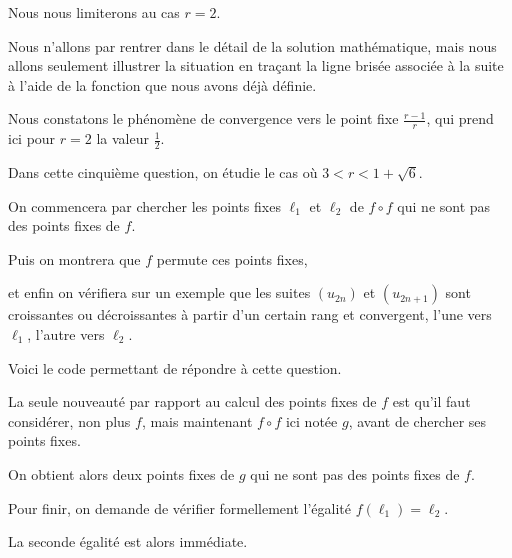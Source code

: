 Nous nous limiterons au cas $r=2$.


\diapo

Nous n'allons par rentrer dans le détail de la solution mathématique, 
mais nous allons seulement illustrer la situation en traçant la 
ligne brisée associée à la suite à l'aide de la fonction 
 que nous avons déjà définie. 

Nous constatons le phénomène de convergence vers le 
point fixe $\frac{r-1}{r}$, qui prend ici pour $r=2$ la valeur $\frac{1}{2}$.


\diapo

Dans cette cinquième question, on étudie le cas où $3<r<1+\sqrt{6}$.

\change

On commencera par chercher les points fixes $\ell_1$ et $\ell_2$ de $f\circ f$  
qui ne sont pas des points fixes de $f$.


\change

Puis on montrera que $f$ permute ces points fixes,

\change

et enfin on vérifiera sur un exemple que les suites $(u_{2n})$ et 
$(u_{2n+1})$ sont croissantes ou décroissantes à partir d'un certain rang
    et convergent, l'une vers $\ell_1$, l'autre vers $\ell_2$.



\diapo

Voici le code permettant de répondre à cette question.

La seule nouveauté par rapport au calcul des points 
fixes de $f$ est qu'il faut considérer, non plus $f$, mais maintenant $f\circ f$ ici notée $g$,
avant de chercher ses points fixes.

\change

On obtient alors deux points fixes de $g$ qui ne sont pas des points fixes de $f$. 

\change

Pour finir, on demande de vérifier formellement l'égalité $f(\ell_1)=\ell_2$. 

La seconde égalité est alors immédiate.

\diapo

